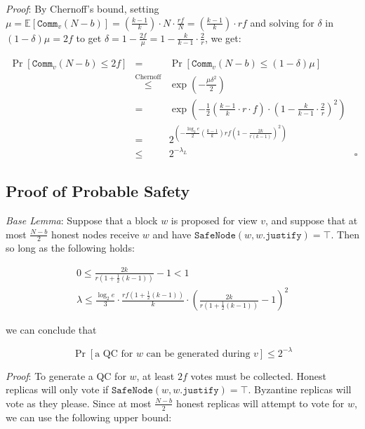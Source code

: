 \documentclass[11pt, oneside]{article}       %
\begin{document}
\emph{Proof}: By Chernoff's bound, setting \(\mu =
\mathbb{E}[\texttt{Comm}_v(N-b)] = \left(\frac{k-1}{k}\right) \cdot N \cdot
\frac{rf}{N} = \left(\frac{k-1}{k}\right)\cdot rf\) and solving for
\(\delta\) in \((1-\delta)\mu = 2f\) to get \(\delta = 1 - \frac{2f}{\mu} =
1 - \frac{k}{k-1}\cdot \frac{2}{r}\), we get:

\[
\begin{array}{rclr}
    \Pr[\texttt{Comm}_v(N-b) \leq 2f] & = & \Pr[\texttt{Comm}_v(N-b) \leq
    (1-\delta)\mu] \\
    &\overset{\text{Chernoff}}{\leq}&
    \exp\left( -\frac{\mu\delta^2}{2}\right) \\
    &=&
         \exp\left(-\frac{1}{2}\left(\frac{k-1}{k}
         \cdot r\cdot f \right) \cdot
         \left(1-\frac{k}{k-1}\cdot \frac{2}{r}\right)^2
    \right)
    \\
    &=& 2^{\left(-\frac{\log_2 e}{2} \left(\frac{k-1}{k}\right) r f \left(1 -
    \frac{2k}{r(k-1)}\right)^2\right)} \\
    &\leq&2^{-\lambda_L} & \square
\end{array}
\]

\subsection*{Proof of Probable Safety}

\emph{Base Lemma}: Suppose that a block \(w\) is proposed for view \(v\),
and suppose that at most \(\frac{N-b}{2}\) honest nodes receive \(w\) and
have \(\texttt{SafeNode}(w,w.\texttt{justify}) = \top\). Then so long as
the following holds:

\begin{equation}\label{lemma_majority}
    \begin{array}{c}
        0 \leq \frac{2k}{r\left(1+\frac{1}{2}(k-1)\right)} - 1 < 1 \\
        \lambda \leq \frac{\log_2 e 
        }{3}\cdot\frac{rf\left(1+\frac{1}{2}(k-1)\right)}{k}\cdot
        {\left(\frac{2k}{r\left(1+\frac{1}{2}(k-1)\right)} - 1\right)}^2
    \end{array}
\end{equation}

we can conclude that

\[
    \Pr[\text{a QC for \(w\) can be generated during \(v\)}] \leq 2^{-\lambda}
\]

\emph{Proof}: To generate a QC for \(w\), at least \(2f\) votes must be
collected. Honest replicas will only vote if
\(\texttt{SafeNode}(w,w.\texttt{justify}) = \top\). Byzantine replicas will
vote as they please. Since at most \(\frac{N-b}{2}\) honest replicas will
attempt to vote for \(w\), we can use the following upper bound:
\end{document}
